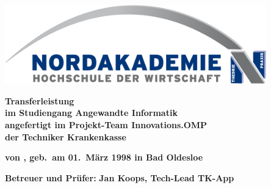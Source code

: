 
\thispagestyle{empty}
\begin{center}
\vspace*{-2cm}
\includegraphics[width=0.85\textwidth]{Bilder/Logo_NAK}\\
\vspace*{1.5cm}
    {\titlefont\huge\onehalfspacing{}
	\thetitle{}
    \par}%
\vfill
{
    \normalfont\normalcolor\bfseries\large
    Transferleistung \\
    \large
    im Studiengang Angewandte Informatik\\
    angefertigt im Projekt-Team Innovations.OMP\\
    der Techniker Krankenkasse\\
    \par
}
\end{center}\par
\vspace*{2.5cm}
\noindent\begin{minipage}[b]{\textwidth}
{
  \noindent \textbf{von \theauthor, geb.~am 01.~März 1998 in Bad Oldesloe}\\

  \begin{tabbing}
  \textbf{Betreuer und Prüfer:}  \= \textbf{Jan Koops, Tech-Lead TK-App}
  \\
  \\
  \\
  \end{tabbing}

  \noindent\textbf{\theLocationAndDate}
}
\end{minipage}
